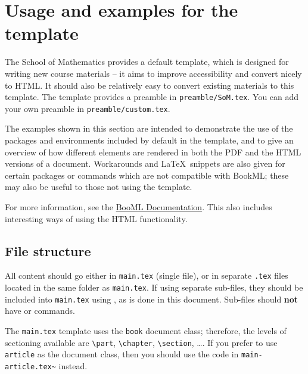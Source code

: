 \chapter{Usage and examples for the template}
\label{demo}

The School of Mathematics provides a default template, which is designed for writing new course materials -- it aims to improve accessibility and convert nicely to HTML. It should also be relatively easy to convert existing materials to this template. The template provides a preamble in \verb|preamble/SoM.tex|. You can add your own preamble in \verb|preamble/custom.tex|.

The examples shown in this section are intended to demonstrate the use of the packages and environments included by default in the template, and to give an overview of how different elements are rendered in both the PDF and the HTML versions of a document. Workarounds and \LaTeX\ snippets are also given for certain packages or commands which are not compatible with BookML; these may also be useful to those not using the template.

For more information, see the \href{https://vlmantova.github.io/bookml/#S3.SS1}{BooML Documentation}. This also includes interesting ways of using the HTML functionality.

\section{File structure}
\label{demo:struct}


All content should go either in \verb|main.tex| (single file), or in separate \verb|.tex| files located in the same folder as \verb|main.tex|. If using separate sub-files, they should be included into \verb|main.tex| using \verb||, as is done in this document. Sub-files should \textbf{not} have \verb|| or \verb|| commands.

The \verb|main.tex| template uses the \verb|book| document class; therefore, the levels of sectioning available are \verb|\part|, \verb|\chapter|, \verb|\section|, \ldots. If you prefer to use \verb|article| as the document class, then you should use the code in \verb|main-article.tex~| instead.

